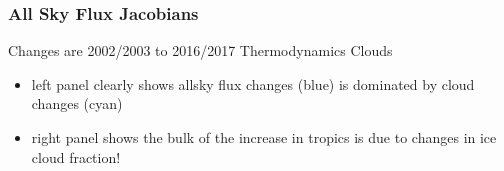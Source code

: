 \documentclass[10pt,t]{beamer}
\begin{document}
\begin{frame}
  \frametitle{All Sky Flux Jacobians}
  Changes are 2002/2003 to 2016/2017  \newline
  \hspace{0.50in} Thermodynamics \hspace{1.75in} Clouds \\
  \begin{center}
  \end{center}
  \begin{itemize}
  \item left panel clearly shows allsky flux changes (blue) is dominated by cloud changes (cyan)
  \item right panel shows the bulk of the increase in tropics is due to changes in ice cloud fraction!
  \end{itemize}  
\end{frame}
\end{document}
